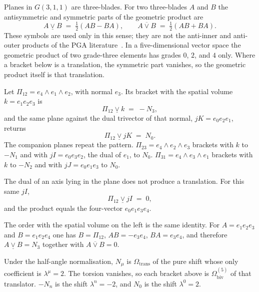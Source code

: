 \documentclass[a4paper]{article}
\begin{document}
Planes in \(G(3,1,1)\) are three-blades. For two three-blades \(A\) and \(B\) the antisymmetric and symmetric parts of the geometric product are
\[
A \mathbin{\underline{\vee}} B \;=\; \tfrac12(AB-BA),\qquad
A \mathbin{\overline{\vee}} B \;=\; \tfrac12(AB+BA).
\]
These symbols are used only in this sense; they are not the anti-inner and anti-outer products of the PGA literature~\cite{Lengyel2024,DorstFontijneMann2007}. In a five-dimensional vector space the geometric product of two grade-three elements has grades \(0\), \(2\), and \(4\) only. Where a bracket below is a translation, the symmetric part vanishes, so the geometric product itself is that translation.

Let \(\Pi_{12}=e_{4}\wedge e_{1}\wedge e_{2}\), with normal \(e_{3}\). Its bracket with the spatial volume \(k=e_{1}e_{2}e_{3}\) is
\[
\Pi_{12}\mathbin{\underline{\vee}} k \;=\; -N_{3},
\]
and the same plane against the dual trivector of that normal, \(jK=e_{0}e_{2}e_{1}\), returns
\[
\Pi_{12}\mathbin{\underline{\vee}} jK \;=\; N_{0}.
\]
The companion planes repeat the pattern. \(\Pi_{23}=e_{4}\wedge e_{2}\wedge e_{3}\) brackets with \(k\) to \(-N_{1}\) and with \(jI=e_{0}e_{3}e_{2}\), the dual of \(e_{1}\), to \(N_{0}\). \(\Pi_{31}=e_{4}\wedge e_{3}\wedge e_{1}\) brackets with \(k\) to \(-N_{2}\) and with \(jJ=e_{0}e_{1}e_{3}\) to \(N_{0}\).

The dual of an axis lying in the plane does not produce a translation. For this same \(jI\),
\[
\Pi_{12}\mathbin{\underline{\vee}} jI \;=\; 0,
\]
and the product equals the four-vector \(e_{0}e_{1}e_{3}e_{4}\).

The order with the spatial volume on the left is the same identity. For \(A=e_{1}e_{2}e_{3}\) and \(B=e_{1}e_{2}e_{4}\) one has \(B=\Pi_{12}\), \(AB=-e_{3}e_{4}\), \(BA=e_{3}e_{4}\), and therefore \(A\mathbin{\underline{\vee}}B=N_{3}\) together with \(A\mathbin{\overline{\vee}}B=0\).

Under the half-angle normalisation, \(N_{\mu}\) is \(\Omega_{\mathrm{trans}}\) of the pure shift whose only coefficient is \(\lambda^{\mu}=2\). The torsion vanishes, so each bracket above is \(\Omega_{\mathrm{biv}}^{(5)}\) of that translator. \(-N_{n}\) is the shift \(\lambda^{n}=-2\), and \(N_{0}\) is the shift \(\lambda^{0}=2\).
\end{document}
